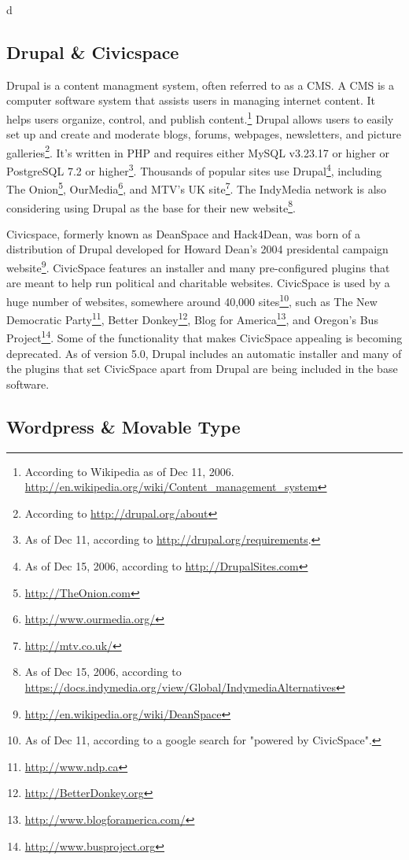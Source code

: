 d\documentclass[a4paper,12pt]{report}
\begin{document}
\subsection {Drupal & Civicspace}
Drupal is a content managment system, often referred to as a CMS.
A CMS is a computer software system that assists users in managing internet content. 
It helps users organize, control, and publish content.\footnote{According to Wikipedia as of Dec 11, 2006.  \url{http://en.wikipedia.org/wiki/Content_management_system}}
Drupal allows users to easily set up and create and moderate blogs, forums, webpages, newsletters, and picture galleries\footnote{According to \url{http://drupal.org/about}}. 
It's written in PHP and requires either MySQL v3.23.17 or higher or PostgreSQL 7.2 or higher\footnote{As of Dec 11, according to \url{http://drupal.org/requirements}.}. 
Thousands of popular sites use Drupal\footnote{As of Dec 15, 2006, according to \url{http://DrupalSites.com}}, including The Onion\footnote{\url{http://TheOnion.com}}, OurMedia\footnote{\url{http://www.ourmedia.org/}}, and MTV's UK site\footnote{\url{http://mtv.co.uk/}}. 
The IndyMedia network is also considering using Drupal as the base for their new website\footnote{As of Dec 15, 2006, according to \url{https://docs.indymedia.org/view/Global/IndymediaAlternatives}}. 

Civicspace, formerly known as DeanSpace and Hack4Dean, was born of a distribution of Drupal developed for Howard Dean's 2004 presidental campaign website\footnote{\url{http://en.wikipedia.org/wiki/DeanSpace}}.
CivicSpace features an installer and many pre-configured plugins that are meant to help run political and charitable websites. 
CivicSpace is used by a huge number of websites, somewhere around 40,000 sites\footnote{As of Dec 11, according to a google search for "powered by CivicSpace".}, such as The New Democratic Party\footnote{\url{http://www.ndp.ca}}, Better Donkey\footnote{\url{http://BetterDonkey.org}}, Blog for America\footnote{\url{http://www.blogforamerica.com/}}, and Oregon's Bus Project\footnote{\url{http://www.busproject.org}}. 
Some of the functionality that makes CivicSpace appealing is becoming deprecated. 
As of version 5.0, Drupal includes an automatic installer and many of the plugins that set CivicSpace apart from Drupal are being included in the base software. 


\subsection {Wordpress & Movable Type}
\end{document}
